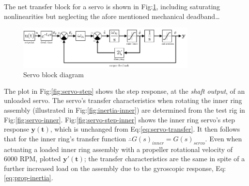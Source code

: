 \par
The net transfer block for a servo is shown in Fig:\ref{fig:servo-block}, including saturating nonlinearities but neglecting the afore mentioned mechanical deadband\ldots
\begin{figure}[hbtp]
\centering
\includegraphics[width=0.8\textwidth]{figs/servo-block}
\vspace{-5pt}
\caption{Servo block diagram}
\label{fig:servo-block}
\vspace{-15pt}
\end{figure}
\par
The plot in Fig:\ref{fig:servo-step} shows the step response, at the \emph{shaft output}, of an unloaded servo. The servo's transfer characteristics when rotating the inner ring assembly (illustrated in Fig:\ref{fig:inertia-inner}) are determined from the test rig in Fig:\ref{fig:servo-inner}. Fig:\ref{fig:servo-step-inner} shows the inner ring servo's step response {\color{Blue}$\mathbf{y(t)}$}, which is unchanged from Eq:\ref{eq:servo-transfer}. It then follows that for the inner ring's transfer function $\therefore G(s)_{inner}=G(s)_{servo}$. Even when actuating a loaded inner ring assembly with a propeller rotational velocity of 6000 RPM, plotted {\color{Red}$\mathbf{y'(t)}$}; the transfer characteristics are the same in spite of a further increased load on the assembly due to the gyroscopic response, Eq:\ref{eq:prop-inertia}.
